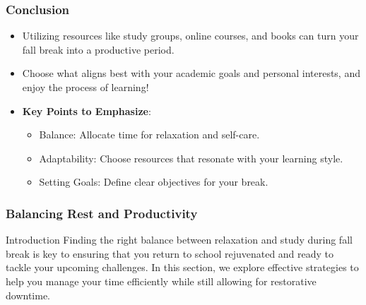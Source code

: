\documentclass[aspectratio=169]{beamer}
\begin{document}
\begin{frame}[fragile]
    \frametitle{Conclusion}
    \begin{itemize}
        \item Utilizing resources like study groups, online courses, and books can turn your fall break into a productive period.
        \item Choose what aligns best with your academic goals and personal interests, and enjoy the process of learning!
        \item \textbf{Key Points to Emphasize}:
            \begin{itemize}
                \item Balance: Allocate time for relaxation and self-care.
                \item Adaptability: Choose resources that resonate with your learning style.
                \item Setting Goals: Define clear objectives for your break.
            \end{itemize}
    \end{itemize}
\end{frame}

\begin{frame}[fragile]
    \frametitle{Balancing Rest and Productivity}
    \begin{block}{Introduction}
        Finding the right balance between relaxation and study during fall break is key to ensuring that you return to school rejuvenated and ready to tackle your upcoming challenges. In this section, we explore effective strategies to help you manage your time efficiently while still allowing for restorative downtime.
    \end{block}
\end{frame}
\end{document}
